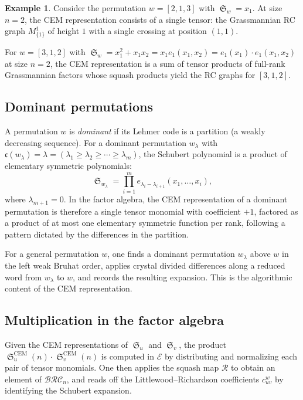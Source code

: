 \documentclass{amsart}
\theoremstyle{definition}
\newtheorem{example}[lemma]{Example}
\theoremstyle{remark}
\numberwithin{equation}{section}
\DeclareMathOperator{\sch}{\mathfrak{S}}
\newcommand{\BRC}{\mathcal{BRC}}
\newcommand{\code}{\mathfrak{c}}
\begin{document}
\begin{example}
Consider the permutation $w = [2, 1, 3]$ with $\sch_w = x_1$.  At size $n = 2$, the CEM representation consists of a single tensor: the Grassmannian RC graph $M_{\{1\}}^1$ of height $1$ with a single crossing at position $(1,1)$.

For $w = [3, 1, 2]$ with $\sch_w = x_1^2 + x_1 x_2 = x_1 e_1(x_1, x_2) = e_1(x_1) \cdot e_1(x_1, x_2)$ at size $n = 2$, the CEM representation is a sum of tensor products of full-rank Grassmannian factors whose squash products yield the RC graphs for $[3, 1, 2]$.
\end{example}

\subsection{Dominant permutations}

A permutation $w$ is \textit{dominant} if its Lehmer code is a partition (a weakly decreasing sequence).  For a dominant permutation $w_\lambda$ with $\code(w_\lambda) = \lambda = (\lambda_1 \geq \lambda_2 \geq \cdots \geq \lambda_m)$, the Schubert polynomial is a product of elementary symmetric polynomials:
\[
\sch_{w_\lambda} = \prod_{i = 1}^{m} e_{\lambda_i - \lambda_{i+1}}(x_1, \ldots, x_i),
\]
where $\lambda_{m+1} = 0$.  In the factor algebra, the CEM representation of a dominant permutation is therefore a single tensor monomial with coefficient $+1$, factored as a product of at most one elementary symmetric function per rank, following a pattern dictated by the differences in the partition.

For a general permutation $w$, one finds a dominant permutation $w_\lambda$ above $w$ in the left weak Bruhat order, applies crystal divided differences along a reduced word from $w_\lambda$ to $w$, and records the resulting expansion.  This is the algorithmic content of the CEM representation.

\subsection{Multiplication in the factor algebra}

Given the CEM representations of $\sch_u$ and $\sch_v$, the product $\sch_u^{\mathrm{CEM}}(n) \cdot \sch_v^{\mathrm{CEM}}(n)$ is computed in $\mathcal{E}$ by distributing and normalizing each pair of tensor monomials.  One then applies the squash map $\mathcal{R}$ to obtain an element of $\BRC_n$, and reads off the Littlewood--Richardson coefficients $c_{uv}^w$ by identifying the Schubert expansion.
\end{document}
